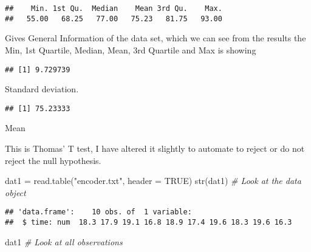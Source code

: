\documentclass[
]{article}
\newenvironment{Shaded}{\begin{snugshade}}{\end{snugshade}}
\newcommand{\AttributeTok}[1]{\textcolor[rgb]{0.77,0.63,0.00}{#1}}
\newcommand{\CommentTok}[1]{\textcolor[rgb]{0.56,0.35,0.01}{\textit{#1}}}
\newcommand{\ConstantTok}[1]{\textcolor[rgb]{0.00,0.00,0.00}{#1}}
\newcommand{\FunctionTok}[1]{\textcolor[rgb]{0.00,0.00,0.00}{#1}}
\newcommand{\NormalTok}[1]{#1}
\newcommand{\OtherTok}[1]{\textcolor[rgb]{0.56,0.35,0.01}{#1}}
\newcommand{\SpecialCharTok}[1]{\textcolor[rgb]{0.00,0.00,0.00}{#1}}
\newcommand{\StringTok}[1]{\textcolor[rgb]{0.31,0.60,0.02}{#1}}
\begin{document}
\begin{verbatim}
##    Min. 1st Qu.  Median    Mean 3rd Qu.    Max. 
##   55.00   68.25   77.00   75.23   81.75   93.00
\end{verbatim}

Gives General Information of the data set, which we can see from the
results the Min, 1st Quartile, Median, Mean, 3rd Quartile and Max is
showing

\begin{Shaded}
\end{Shaded}

\begin{verbatim}
## [1] 9.729739
\end{verbatim}

Standard deviation.

\begin{Shaded}
\end{Shaded}

\begin{verbatim}
## [1] 75.23333
\end{verbatim}

Mean

This is Thomas' T test, I have altered it slightly to automate to reject
or do not reject the null hypothesis.

\begin{Shaded}
\begin{Highlighting}[]
\NormalTok{dat1 }\OtherTok{=} \FunctionTok{read.table}\NormalTok{(}\StringTok{"encoder.txt"}\NormalTok{, }\AttributeTok{header =} \ConstantTok{TRUE}\NormalTok{)}
\FunctionTok{str}\NormalTok{(dat1) }\CommentTok{\# Look at the data object}
\end{Highlighting}
\end{Shaded}

\begin{verbatim}
## 'data.frame':    10 obs. of  1 variable:
##  $ time: num  18.3 17.9 19.1 16.8 18.9 17.4 19.6 18.3 19.6 16.3
\end{verbatim}

\begin{Shaded}
\begin{Highlighting}[]
\NormalTok{dat1 }\CommentTok{\# Look at all observations}
\end{Highlighting}
\end{Shaded}
\end{document}
